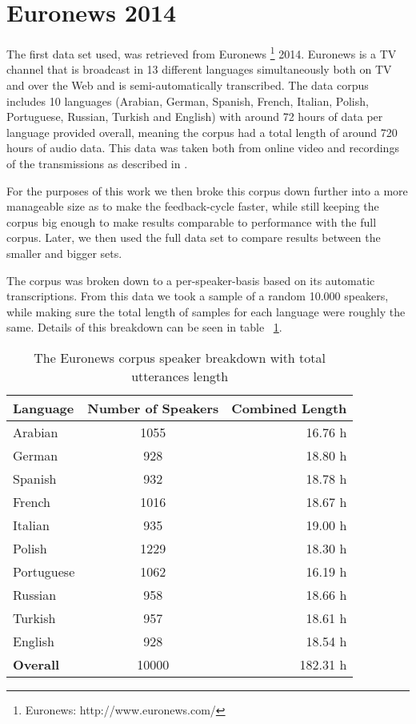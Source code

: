 \section{Euronews 2014}
\label{sec:LITasks:Euronews}


The first data set used, was retrieved from Euronews \footnote{Euronews: http://www.euronews.com/} 2014. Euronews is a TV channel that is broadcast in 13 different languages simultaneously both on TV and over the Web and is semi-automatically transcribed. The data corpus includes 10 languages (Arabian, German, Spanish, French, Italian, Polish, Portuguese, Russian, Turkish and English) with around 72 hours of data per language provided overall, meaning the corpus had a total length of around 720 hours of audio data. This data was taken both from online video and recordings of the transmissions as described in \cite{gretter2014euronews}.

For the purposes of this work we then broke this corpus down further into a more manageable size as to make the feedback-cycle faster, while still keeping the corpus big enough to make results comparable to performance with the full corpus. Later, we then used the full data set to compare results between the smaller and bigger sets.

The corpus was broken down to a per-speaker-basis based on its automatic transcriptions. From this data we took a sample of a random 10.000 speakers, while making sure the total length of samples for each language were roughly the same. Details of this breakdown can be seen in table ~\ref{tab:spkData}.

\begin{table}[h!]
\label{tab:spkData}
\centering
\begin{tabular}{| l | c | r | }
	\hline
	\textbf{Language} & \textbf{Number of Speakers} & \textbf{Combined Length} \\
	\hline
	Arabian & 1055 & 16.76 h \\
	German & 928 & 18.80 h \\
	Spanish & 932 & 18.78 h \\
	French & 1016 & 18.67 h \\  
	Italian & 935 & 19.00 h \\  
	Polish & 1229 & 18.30 h \\ 
	Portuguese & 1062 & 16.19 h \\ 
	Russian & 958 & 18.66 h \\ 
	Turkish & 957 & 18.61 h \\  
	English & 928 & 18.54 h \\ 
	\hline
	\textbf{Overall} & 10000 & 182.31 h\\
	\hline
	
\end{tabular}
\caption{The Euronews corpus speaker breakdown with total utterances length}
\end{table}

